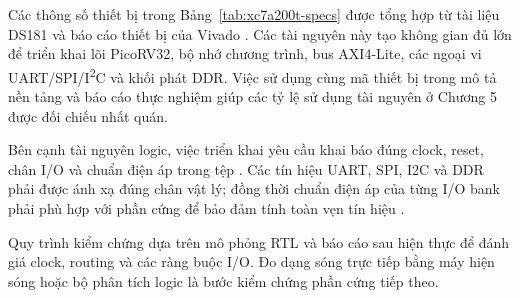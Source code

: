 Các thông số thiết bị trong Bảng~\ref{tab:xc7a200t-specs} được tổng hợp từ tài liệu DS181 và báo cáo thiết bị của Vivado \cite{amd_ds181,amd_vivado_docs}. Các tài nguyên này tạo không gian đủ lớn để triển khai lõi PicoRV32, bộ nhớ chương trình, bus AXI4-Lite, các ngoại vi UART/SPI/I\textsuperscript{2}C và khối phát DDR. Việc sử dụng cùng mã thiết bị trong mô tả nền tảng và báo cáo thực nghiệm giúp các tỷ lệ sử dụng tài nguyên ở Chương 5 được đối chiếu nhất quán.

Bên cạnh tài nguyên logic, việc triển khai yêu cầu khai báo đúng clock, reset, chân I/O và chuẩn điện áp trong tệp . Các tín hiệu UART, SPI, I2C và DDR phải được ánh xạ đúng chân vật lý; đồng thời chuẩn điện áp của từng I/O bank phải phù hợp với phần cứng để bảo đảm tính toàn vẹn tín hiệu \cite{amd_ug949}.

Quy trình kiểm chứng dựa trên mô phỏng RTL và báo cáo sau hiện thực để đánh giá clock, routing và các ràng buộc I/O. Đo dạng sóng trực tiếp bằng máy hiện sóng hoặc bộ phân tích logic là bước kiểm chứng phần cứng tiếp theo.